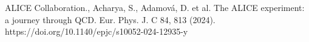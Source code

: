 ALICE Collaboration., Acharya, S., Adamová, D. et al. The ALICE experiment: a journey through QCD. Eur. Phys. J. C 84, 813 (2024). https://doi.org/10.1140/epjc/s10052-024-12935-y